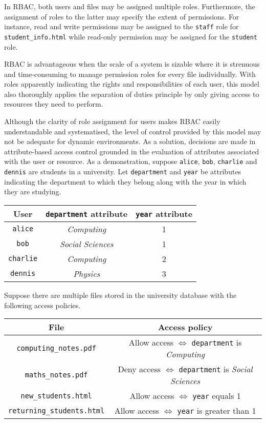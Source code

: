 \documentclass{article}
\begin{document}
In RBAC, both users and files may be assigned multiple roles. Furthermore, the
assignment of roles to the latter may specify the extent of permissions. For
instance, read and write permissions may be assigned to the \texttt{staff}
role for \texttt{student\_info.html} while read-only permission may be
assigned for the \texttt{student} role.

RBAC is advantageous when the scale of a system is sizable where it is
strenuous and time-consuming to manage permission roles for every file
individually. With roles apparently indicating the rights and responsibilities
of each user, this model also thoroughly applies the separation of duties
principle\cite{principles} by only giving access to resources they need
to perform.

Although the clarity of role assignment for users makes RBAC easily
understandable and systematised, the level of control provided by this model
may not be adequate for dynamic environments. As a solution, decisions are made
in attribute-based access control grounded in the evaluation of attributes
associated with the user or resource.\cite{models} As a demonstration,
suppose \texttt{alice}, \texttt{bob}, \texttt{charlie} and \texttt{dennis}
are students in a university. Let \texttt{department} and \texttt{year}
be attributes indicating the department to which they belong along with the
year in which they are studying.

\begin{center} \begin{tabular}{c|cc}
    User & \texttt{department} attribute & \texttt{year} attribute\\ \hline
    \texttt{alice} & \textit{Computing} & 1\\ \texttt{bob} & \textit{Social
    Sciences} & 1\\ \texttt{charlie} & \textit{Computing} & 2\\ \texttt{dennis}
    & \textit{Physics} & 3\\
\end{tabular} \end{center}

Suppose there are multiple files stored in the university database with the
following access policies.

\begin{center} \begin{tabular}{c|c}
    File & Access policy\\ \hline \texttt{computing\_notes.pdf} &
    Allow access $\iff$ \texttt{department} is \textit{Computing}\\
    \texttt{maths\_notes.pdf} & Deny access $\iff$ \texttt{department} is
    \textit{Social Sciences}\\ \texttt{new\_students.html} & Allow access
    $\iff$ \texttt{year} equals 1\\ \texttt{returning\_students.html} &
    Allow access $\iff$ \texttt{year} is greater than 1
\end{tabular} \end{center}
\end{document}
